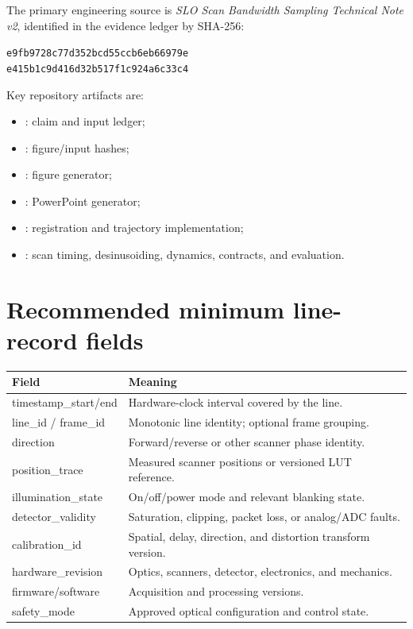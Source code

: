 \documentclass[11pt]{article}
\begin{document}
The primary engineering source is
\textit{SLO Scan Bandwidth Sampling Technical Note v2}, identified in the evidence ledger by
SHA-256:
\begin{center}
  \small\texttt{e9fb9728c77d352bcd55ccb6eb66979e}\\
  \small\texttt{e415b1c9d416d32b517f1c924a6c33c4}
\end{center}
Key repository artifacts are:
\begin{itemize}
  \item {}: claim and input ledger;
  \item {}: figure/input hashes;
  \item {}: figure generator;
  \item {}: PowerPoint generator;
  \item {}: registration and trajectory implementation;
  \item {}: scan timing, desinusoiding, dynamics, contracts, and evaluation.
\end{itemize}

\section{Recommended minimum line-record fields}

\begingroup
\setlength{\tabcolsep}{4pt}
\begin{longtable}{>{\ttfamily}p{} p{}}
\toprule
\normalfont\bfseries Field & \bfseries Meaning\\
\midrule
timestamp\_start/end & Hardware-clock interval covered by the line.\\
line\_id / frame\_id & Monotonic line identity; optional frame grouping.\\
direction & Forward/reverse or other scanner phase identity.\\
position\_trace & Measured scanner positions or versioned LUT reference.\\
illumination\_state & On/off/power mode and relevant blanking state.\\
detector\_validity & Saturation, clipping, packet loss, or analog/ADC faults.\\
calibration\_id & Spatial, delay, direction, and distortion transform version.\\
hardware\_revision & Optics, scanners, detector, electronics, and mechanics.\\
firmware/software & Acquisition and processing versions.\\
safety\_mode & Approved optical configuration and control state.\\
\bottomrule
\end{longtable}
\endgroup
\end{document}
